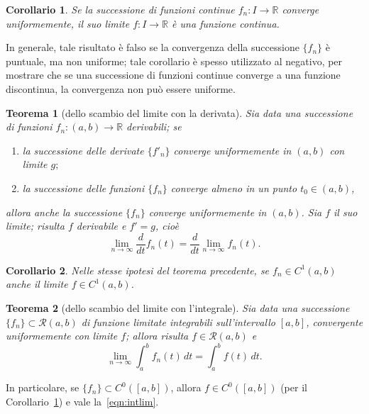 \documentclass[a4paper]{book}
\numberwithin{equation}{section}
\theoremstyle{plain}
\newtheorem{teor}{Teorema}[section]
\newtheorem{cor}{Corollario}[section]
\theoremstyle{definition}
\theoremstyle{remark}
\theoremstyle{example}
\begin{document}
		\begin{cor}
			\label{cor:contlim}
			Se la successione di funzioni continue $f_n \colon I \to \mathbb{R}$ converge uniformemente, il suo limite $f \colon I \to \mathbb{R}$ è una funzione continua.
		\end{cor}

		In generale, tale risultato è falso se la convergenza della successione $\{ f_n\}$ è puntuale, ma non uniforme; tale corollario è spesso utilizzato al negativo, per mostrare che se una successione di funzioni continue converge a una funzione discontinua, la convergenza non può essere uniforme.

		\begin{teor}[dello scambio del limite con la derivata]
			\label{teor:limder}
			Sia data una successione di funzioni $f_n \colon (a, b) \to \mathbb{R}$ derivabili; se
				\begin{enumerate}
					\item la successione delle derivate $\{ f'_n\}$ converge uniformemente in $(a, b)$ con limite $g;$
					\item la successione delle funzioni $\{f_n \}$ converge almeno in un punto $t_0 \in (a, b)$,
				\end{enumerate}
			allora anche la successione $\{f_n\}$ converge uniformemente in $(a, b)$. Sia $f$ il suo limite; risulta $f$ derivabile e $f' = g$, cioè
				\begin{equation}
					\lim_{n \to \infty} \frac{d}{dt}f_n(t) = \frac{d}{dt} \lim_{n \to \infty} f_n(t).
				\end{equation}
		\end{teor}

		\begin{cor}
			Nelle stesse ipotesi del teorema precedente, se $f_n \in C^1(a, b)$ anche il limite $f \in C^1(a, b)$.
		\end{cor}

		\begin{teor}[dello scambio del limite con l'integrale]
			Sia data una successione $\{ f_n\} \subset \mathcal{R}(a, b)$ di funzione limitate integrabili sull'intervallo $[a, b]$, convergente uniformemente con limite $f$; allora risulta $f \in \mathcal{R}(a, b)$ e
			 	\begin{equation}
						\label{eqn:intlim}
					\lim_{n\to \infty} \int_a^b f_n(t)\,dt = \int_a^b f(t)\,dt.
				\end{equation}
		\end{teor}

		In particolare, se $\{f_n\} \subset C^0([a, b])$, allora $f \in C^0([a, b])$ (per il Corollario~\ref{cor:contlim}) e vale la~\eqref{eqn:intlim}.
\end{document}
